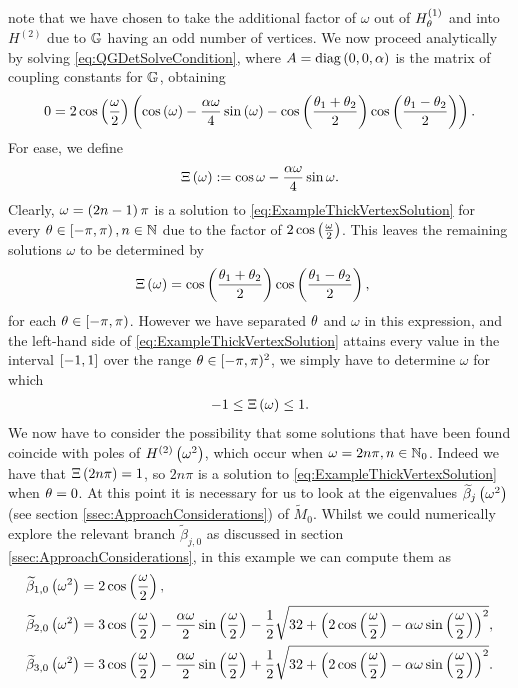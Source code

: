 note that we have chosen to take the additional factor of $\omega$ out of $H_\theta^{(1)}$ and into $H^{(2)}$ due to $\mathbb{G}$ having an odd number of vertices.
We now proceed analytically by solving \eqref{eq:QGDetSolveCondition}, where $A=\mathrm{diag}\left( 0,0,\alpha \right)$ is the matrix of coupling constants for $\mathbb{G}$, obtaining
\begin{align} \label{eq:ExampleThickVertexSolution}
	0 = 2\cos\left( \frac{\omega}{2} \right)
	\left(  \cos\left( \omega \right) - \frac{\alpha\omega}{4}\sin\left( \omega \right) - \cos\left( \frac{\theta_1+\theta_2}{2} \right)\cos\left( \frac{\theta_1-\theta_2}{2} \right)  \right).
\end{align}
For ease, we define
\begin{align*}
	\Xi\left( \omega \right) := \cos\omega - \frac{\alpha\omega}{4}\sin\omega.
\end{align*}
Clearly, $\omega=\left( 2n-1 \right)\pi$ is a solution to \eqref{eq:ExampleThickVertexSolution} for every $\theta\in\left[-\pi,\pi\right), n\in\mathbb{N}$ due to the factor of $2\cos\left( \frac{\omega}{2} \right)$.
This leaves the remaining solutions $\omega$ to be determined by
\begin{align*}
	\Xi\left( \omega \right) &= \cos\left( \frac{\theta_1+\theta_2}{2} \right)\cos\left( \frac{\theta_1-\theta_2}{2} \right),
\end{align*}
for each $\theta\in\left[-\pi,\pi\right)$.
However we have separated $\theta$ and $\omega$ in this expression, and the left-hand side of \eqref{eq:ExampleThickVertexSolution} attains every value in the interval $\left[ -1,1 \right]$ over the range $\theta\in[-\pi,\pi)^2$, we simply have to determine $\omega$ for which
\begin{align} \label{eq:ExampleThickVertexDispExpr}
	-1 \leq \Xi\left( \omega \right) \leq 1.
\end{align}
We now have to consider the possibility that some solutions that have been found coincide with poles of $H^{(2)}\left( \omega^2 \right)$, which occur when $\omega = 2n\pi, n\in\mathbb{N}_0$.
Indeed we have that $\Xi\left( 2n\pi \right)=1$, so $2n\pi$ is a solution to \eqref{eq:ExampleThickVertexSolution} when $\theta=0$.
At this point it is necessary for us to look at the eigenvalues $\widetilde{\beta}_j\left( \omega^2 \right)$ (see section \ref{ssec:ApproachConsiderations}) of $\tilde{M}_0$.
Whilst we could numerically explore the relevant branch $\widetilde{\beta}_{j,0}$ as discussed in section \ref{ssec:ApproachConsiderations}, in this example we can compute them as
\begin{align*}
	\widetilde{\beta}_{1,0}\left( \omega^2 \right) &= 2\cos\left( \frac{\omega}{2} \right), \\
	\widetilde{\beta}_{2,0}\left( \omega^2 \right) &= 3\cos\left( \frac{\omega}{2} \right) - \frac{\alpha\omega}{2}\sin\left( \frac{\omega}{2} \right) - \frac{1}{2}\sqrt{ 32 + \left(  2\cos\left( \frac{\omega}{2} \right) - \alpha\omega\sin\left( \frac{\omega}{2} \right)  \right)^2 }, \\
	\widetilde{\beta}_{3,0}\left( \omega^2 \right) &= 3\cos\left( \frac{\omega}{2} \right) - \frac{\alpha\omega}{2}\sin\left( \frac{\omega}{2} \right) + \frac{1}{2}\sqrt{ 32 + \left(  2\cos\left( \frac{\omega}{2} \right) - \alpha\omega\sin\left( \frac{\omega}{2} \right)  \right)^2 }.
\end{align*}
